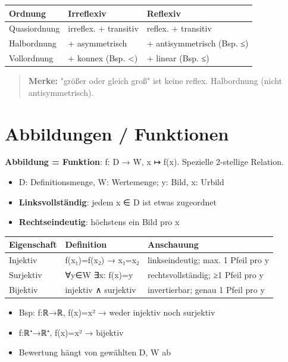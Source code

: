 \documentclass[11pt, a4paper]{article}
\begin{document}
{\small
\begin{tabularx}{\linewidth}{XXX}
\hline
\rowcolor{tableheadbg}
{\color{white}\textbf{Ordnung}} & {\color{white}\textbf{Irreflexiv}} & {\color{white}\textbf{Reflexiv}} \\[2pt]
\hline
\endhead
\hline
\endfoot
Quasiordnung & irreflex. + transitiv & reflex. + transitiv \\
Halbordnung & + asymmetrisch & + antisymmetrisch (Bsp. ≤) \\
Vollordnung & + konnex (Bsp. <) & + linear (Bsp. ≤) \\
\end{tabularx}
}


\begin{quote}
\textbf{Merke:} "größer oder gleich groß" ist keine reflex. Halbordnung (nicht antisymmetrisch).
\end{quote}


\section{Abbildungen / Funktionen}

\textbf{Abbildung = Funktion}: f: D → W, x ↦ f(x). Spezielle 2-stellige Relation.

\begin{itemize}
  \item D: Definitionsmenge, W: Wertemenge; y: Bild, x: Urbild
  \item \textbf{Linksvollständig}: jedem x ∈ D ist etwas zugeordnet
  \item \textbf{Rechtseindeutig}: höchstens ein Bild pro x
\end{itemize}


{\small
\begin{tabularx}{\linewidth}{XXX}
\hline
\rowcolor{tableheadbg}
{\color{white}\textbf{Eigenschaft}} & {\color{white}\textbf{Definition}} & {\color{white}\textbf{Anschauung}} \\[2pt]
\hline
\endhead
\hline
\endfoot
Injektiv & f(x₁)=f(x₂) → x₁=x₂ & linkseindeutig; max. 1 Pfeil pro y \\
Surjektiv & ∀y∈W ∃x: f(x)=y & rechtsvollständig; ≥1 Pfeil pro y \\
Bijektiv & injektiv ∧ surjektiv & invertierbar; genau 1 Pfeil pro y \\
\end{tabularx}
}


\begin{itemize}
  \item Bsp: f:ℝ→ℝ, f(x)=x² → weder injektiv noch surjektiv
  \item f:ℝ⁺→ℝ⁺, f(x)=x² → bijektiv
  \item Bewertung hängt von gewählten D, W ab
\end{itemize}
\end{document}
